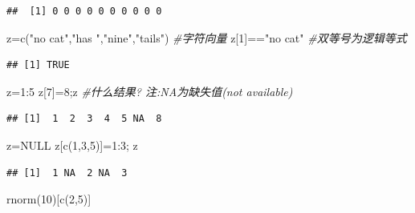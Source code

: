 \documentclass[
]{book}
\newenvironment{Shaded}{\begin{snugshade}}{\end{snugshade}}
\newcommand{\CommentTok}[1]{\textcolor[rgb]{0.56,0.35,0.01}{\textit{#1}}}
\newcommand{\ConstantTok}[1]{\textcolor[rgb]{0.00,0.00,0.00}{#1}}
\newcommand{\DecValTok}[1]{\textcolor[rgb]{0.00,0.00,0.81}{#1}}
\newcommand{\FunctionTok}[1]{\textcolor[rgb]{0.00,0.00,0.00}{#1}}
\newcommand{\NormalTok}[1]{#1}
\newcommand{\OtherTok}[1]{\textcolor[rgb]{0.56,0.35,0.01}{#1}}
\newcommand{\SpecialCharTok}[1]{\textcolor[rgb]{0.00,0.00,0.00}{#1}}
\newcommand{\StringTok}[1]{\textcolor[rgb]{0.31,0.60,0.02}{#1}}
\begin{document}
\begin{verbatim}
##  [1] 0 0 0 0 0 0 0 0 0 0
\end{verbatim}

\begin{Shaded}
\begin{Highlighting}[]
\NormalTok{z}\OtherTok{=}\FunctionTok{c}\NormalTok{(}\StringTok{"no cat"}\NormalTok{,}\StringTok{"has "}\NormalTok{,}\StringTok{"nine"}\NormalTok{,}\StringTok{"tails"}\NormalTok{) }\CommentTok{\#字符向量}
\NormalTok{z[}\DecValTok{1}\NormalTok{]}\SpecialCharTok{==}\StringTok{"no cat"} \CommentTok{\#双等号为逻辑等式}
\end{Highlighting}
\end{Shaded}

\begin{verbatim}
## [1] TRUE
\end{verbatim}

\begin{Shaded}
\begin{Highlighting}[]
\NormalTok{z}\OtherTok{=}\DecValTok{1}\SpecialCharTok{:}\DecValTok{5}
\NormalTok{z[}\DecValTok{7}\NormalTok{]}\OtherTok{=}\DecValTok{8}\NormalTok{;z }\CommentTok{\#什么结果? 注:NA为缺失值(not available)}
\end{Highlighting}
\end{Shaded}

\begin{verbatim}
## [1]  1  2  3  4  5 NA  8
\end{verbatim}

\begin{Shaded}
\begin{Highlighting}[]
\NormalTok{z}\OtherTok{=}\ConstantTok{NULL}
\NormalTok{z[}\FunctionTok{c}\NormalTok{(}\DecValTok{1}\NormalTok{,}\DecValTok{3}\NormalTok{,}\DecValTok{5}\NormalTok{)]}\OtherTok{=}\DecValTok{1}\SpecialCharTok{:}\DecValTok{3}\NormalTok{;}
\NormalTok{z}
\end{Highlighting}
\end{Shaded}

\begin{verbatim}
## [1]  1 NA  2 NA  3
\end{verbatim}

\begin{Shaded}
\begin{Highlighting}[]
\FunctionTok{rnorm}\NormalTok{(}\DecValTok{10}\NormalTok{)[}\FunctionTok{c}\NormalTok{(}\DecValTok{2}\NormalTok{,}\DecValTok{5}\NormalTok{)]}
\end{Highlighting}
\end{Shaded}
\end{document}
